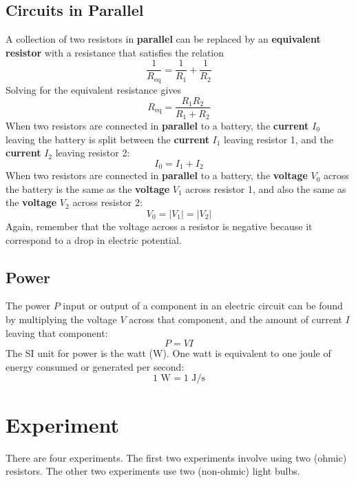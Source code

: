 \subsection{Circuits in Parallel}
%
A collection of two resistors in \textbf{parallel} can be replaced by an \textbf{equivalent resistor} with a resistance that satisfies the relation
\begin{equation}
	\frac{1}{R_{\text{eq}}} = \frac{1}{R_{1}} + \frac{1}{R_{2}}
\end{equation}
Solving for the equivalent resistance gives
\begin{equation} \label{eq.03.RParallel}
	R_{\text{eq}} = \frac{R_{1} R_{2}}{R_{1} + R_{2}}
\end{equation}
When two resistors are connected in \textbf{parallel} to a battery, the \textbf{current} $I_{0}$ leaving the battery is split between the \textbf{current} $I_{1}$ leaving resistor 1, and the \textbf{current} $I_{2}$ leaving resistor 2:
\begin{equation} \label{eq.03.IParallel}
	I_{0} = I_{1} + I_{2}
\end{equation}
When two resistors are connected in \textbf{parallel} to a battery, the \textbf{voltage} $V_{0}$ across the battery is the same as the \textbf{voltage} $V_{1}$ across resistor 1, and also the same as the \textbf{voltage} $V_{2}$ across resistor 2:
\begin{equation} \label{eq.03.VParallel}
	V_{0} = \left| V_{1} \right| = \left| V_{2} \right|
\end{equation}
Again, remember that the voltage across a resistor is negative because it correspond to a drop in electric potential.
%
\subsection{Power}
%
The power $P$ input or output of a component in an electric circuit can be found by multiplying the voltage $V$ across that component, and the amount of current $I$ leaving that component:
\begin{equation}
	P = VI
\end{equation}
The SI unit for power is the watt (W). One watt is equivalent to one joule of energy consumed or generated per second:
\begin{equation}
	1 \text{ W} = 1 \text{ J/s}
\end{equation}
%
\section{Experiment}
%
There are four experiments. The first two experiments involve using two (ohmic) resistors. The other two experiments use two (non-ohmic) light bulbs.
%
